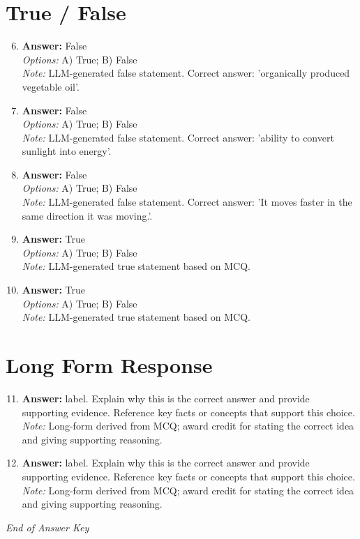 \documentclass[12pt]{article}
\begin{document}
\section*{True / False}
\begin{enumerate}[label=\arabic*.]
\setcounter{enumi}{5}
\item \textbf{Answer:} False
\\ \textit{Options:} A) True; B) False
\\ \textit{Note:} LLM-generated false statement. Correct answer: 'organically produced vegetable oil'.
\item \textbf{Answer:} False
\\ \textit{Options:} A) True; B) False
\\ \textit{Note:} LLM-generated false statement. Correct answer: 'ability to convert sunlight into energy'.
\item \textbf{Answer:} False
\\ \textit{Options:} A) True; B) False
\\ \textit{Note:} LLM-generated false statement. Correct answer: 'It moves faster in the same direction it was moving.'.
\item \textbf{Answer:} True
\\ \textit{Options:} A) True; B) False
\\ \textit{Note:} LLM-generated true statement based on MCQ.
\item \textbf{Answer:} True
\\ \textit{Options:} A) True; B) False
\\ \textit{Note:} LLM-generated true statement based on MCQ.
\end{enumerate}

\section*{Long Form Response}
\begin{enumerate}[label=\arabic*.]
\setcounter{enumi}{10}
\item \textbf{Answer:} label. Explain why this is the correct answer and provide supporting evidence. Reference key facts or concepts that support this choice.
\\ \textit{Note:} Long-form derived from MCQ; award credit for stating the correct idea and giving supporting reasoning.
\item \textbf{Answer:} label. Explain why this is the correct answer and provide supporting evidence. Reference key facts or concepts that support this choice.
\\ \textit{Note:} Long-form derived from MCQ; award credit for stating the correct idea and giving supporting reasoning.
\end{enumerate}

\vfill
\noindent\textit{End of Answer Key}
\end{document}

